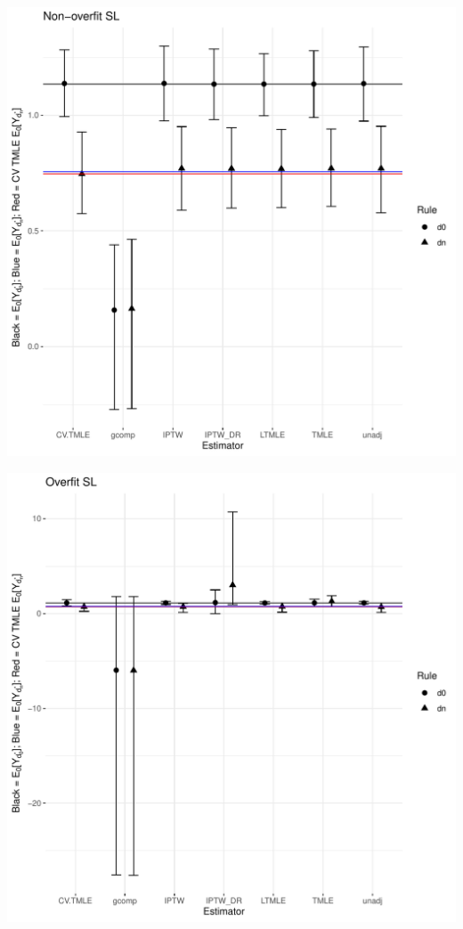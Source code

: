 \documentclass[11pt]{article}\usepackage[]{graphicx}\usepackage[]{color}
\makeatletter
\def\maxwidth{ %
  \ifdim\Gin@nat@width>\linewidth
    \linewidth
  \else
    \Gin@nat@width
  \fi
}
\newenvironment{knitrout}{}{} %
\makeatother
\begin{document}
\begin{knitrout}
\includegraphics[width=\maxwidth]{figure/unnamed-chunk-1-3} 

\includegraphics[width=\maxwidth]{figure/unnamed-chunk-1-4} 


\end{knitrout}
\end{document}
